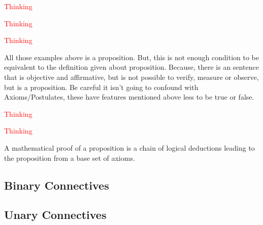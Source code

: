 \begin{example}
    \textcolor{red}{Thinking}
\end{example}

\begin{example}
    \textcolor{red}{Thinking}
\end{example}

\begin{example}
    \textcolor{red}{Thinking}
\end{example}

All those examples above is a proposition. But, this is not enough condition to be equivalent to the definition given about proposition. Because, there is an sentence that is objective and affirmative, but is not possible to verify, measure or observe, but is a proposition. Be careful it isn't going to confound with Axioms/Postulates, these have features mentioned above less to be true or false.

\begin{example}
    \textcolor{red}{Thinking}
\end{example}

\begin{example}
    \textcolor{red}{Thinking}
\end{example}

\begin{definition}
A mathematical proof of a proposition is a chain of logical deductions
leading to the proposition from a base set of axioms.

\end{definition}

\subsection{Binary Connectives}

\subsection{Unary Connectives}

\printbibliography[heading=subbibliography, title={Referências da Seção 1.1}, keyword=chapter1secao1]